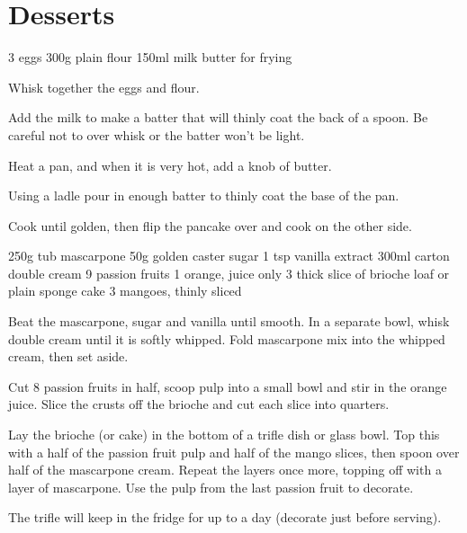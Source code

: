\chapter{Desserts}
\minitoc

\label{desserts:crepes}
\begin{ingreds}
    3 eggs
    300g plain flour
    150ml milk
    butter for frying
\end{ingreds}

\begin{method}
    Whisk together the eggs and flour.

    Add the milk to make a batter that will thinly coat the
    back of a spoon.  Be careful not to over whisk or the batter
    won't be light.

    Heat a pan, and when it is very hot, add a knob of butter.

    Using a ladle pour in enough batter to thinly coat the base of
    the pan.

    Cook until golden, then flip the pancake over and cook on the
    other side.

\end{method}


\begin{ingreds}
	250g tub mascarpone
    50g golden caster sugar
    1 tsp vanilla extract
    300ml carton double cream
    9 passion fruits
    1 orange, juice only
    3 thick slice of brioche loaf or plain sponge cake
    3 mangoes, thinly sliced
\end{ingreds}

\begin{method}
    Beat the mascarpone, sugar and vanilla until smooth. In a 
    separate bowl, whisk double cream until it is softly whipped. 
    Fold mascarpone mix into the whipped cream, then set aside.

    Cut 8 passion fruits in half, scoop pulp into a small bowl and 
    stir in the orange juice. Slice the crusts off the brioche and 
    cut each slice into quarters.

    Lay the brioche (or cake) in the bottom of a trifle dish or 
    glass bowl. Top this with a half of the passion fruit pulp and 
    half of the mango slices, then spoon over half of the mascarpone 
    cream. Repeat the layers once more, 
    topping off with a layer of mascarpone. Use the pulp from the last 
    passion fruit to decorate. 

    The trifle will keep in the fridge for up to a day (decorate just 
    before serving).
\end{method}